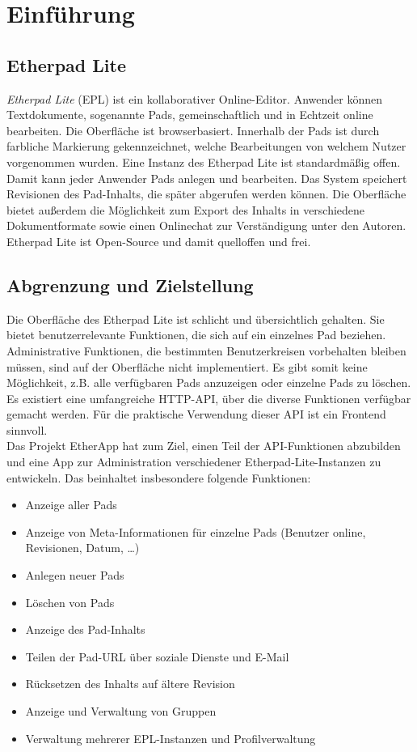 \section{Einführung} %
\label{sec:intro}

\subsection{Etherpad Lite}
\label{sub:intro:etherpad}

\textit{Etherpad Lite} (EPL) ist ein kollaborativer Online-Editor.
Anwender können Textdokumente, sogenannte Pads, gemeinschaftlich und in Echtzeit online bearbeiten.
Die Oberfläche ist browserbasiert.
Innerhalb der Pads ist durch farbliche Markierung gekennzeichnet, welche Bearbeitungen von welchem Nutzer vorgenommen wurden.
Eine Instanz des Etherpad Lite ist standardmäßig offen.
Damit kann jeder Anwender Pads anlegen und bearbeiten.
Das System speichert Revisionen des Pad-Inhalts, die später abgerufen werden können.
Die Oberfläche bietet außerdem die Möglichkeit zum Export des Inhalts in verschiedene Dokumentformate sowie einen Onlinechat zur Verständigung unter den Autoren.\\
Etherpad Lite ist Open-Source und damit quelloffen und frei.

\subsection{Abgrenzung und Zielstellung}
Die Oberfläche des Etherpad Lite ist schlicht und übersichtlich gehalten.
Sie bietet benutzerrelevante Funktionen, die sich auf ein einzelnes Pad beziehen.
Administrative Funktionen, die bestimmten Benutzerkreisen vorbehalten bleiben müssen, sind auf der Oberfläche nicht implementiert.
Es gibt somit keine Möglichkeit, z.B. alle verfügbaren Pads anzuzeigen oder einzelne Pads zu löschen.\\
Es existiert eine umfangreiche HTTP-API, über die diverse Funktionen verfügbar gemacht werden.
Für die praktische Verwendung dieser API ist ein Frontend sinnvoll.\\
Das Projekt EtherApp hat zum Ziel, einen Teil der API-Funktionen abzubilden und eine App zur Administration verschiedener Etherpad-Lite-Instanzen zu entwickeln.
Das beinhaltet insbesondere folgende Funktionen:

\begin{itemize}
	\item Anzeige aller Pads
	\item Anzeige von Meta-Informationen für einzelne Pads (Benutzer online, Revisionen, Datum, …)
	\item Anlegen neuer Pads
	\item Löschen von Pads
	\item Anzeige des Pad-Inhalts
	\item Teilen der Pad-URL über soziale Dienste und E-Mail
	\item Rücksetzen des Inhalts auf ältere Revision
	\item Anzeige und Verwaltung von Gruppen
	\item Verwaltung mehrerer EPL-Instanzen und Profilverwaltung
\end{itemize}



